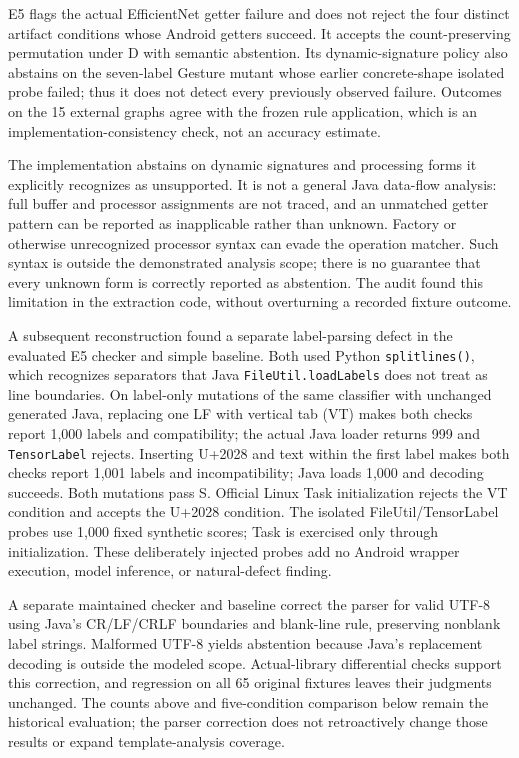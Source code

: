 \documentclass[10pt,twocolumn,letterpaper]{article}
\newcommand{\code}[1]{\texttt{#1}}
\begin{document}
E5 flags the actual EfficientNet getter failure and does not reject the four distinct artifact conditions whose Android getters succeed. It accepts the count-preserving permutation under D with semantic abstention. Its dynamic-signature policy also abstains on the seven-label Gesture mutant whose earlier concrete-shape isolated probe failed; thus it does not detect every previously observed failure. Outcomes on the 15 external graphs agree with the frozen rule application, which is an implementation-consistency check, not an accuracy estimate.

The implementation abstains on dynamic signatures and processing forms it explicitly recognizes as unsupported. It is not a general Java data-flow analysis: full buffer and processor assignments are not traced, and an unmatched getter pattern can be reported as inapplicable rather than unknown. Factory or otherwise unrecognized processor syntax can evade the operation matcher. Such syntax is outside the demonstrated analysis scope; there is no guarantee that every unknown form is correctly reported as abstention. The audit found this limitation in the extraction code, without overturning a recorded fixture outcome.

A subsequent reconstruction found a separate label-parsing defect in the evaluated E5 checker and simple baseline. Both used Python \code{splitlines()}, which recognizes separators that Java \code{FileUtil.loadLabels} does not treat as line boundaries. On label-only mutations of the same classifier with unchanged generated Java, replacing one LF with vertical tab (VT) makes both checks report 1,000 labels and compatibility; the actual Java loader returns 999 and \code{TensorLabel} rejects. Inserting U+2028 and text within the first label makes both checks report 1,001 labels and incompatibility; Java loads 1,000 and decoding succeeds. Both mutations pass S. Official Linux Task initialization rejects the VT condition and accepts the U+2028 condition. The isolated FileUtil/TensorLabel probes use 1,000 fixed synthetic scores; Task is exercised only through initialization. These deliberately injected probes add no Android wrapper execution, model inference, or natural-defect finding.

A separate maintained checker and baseline correct the parser for valid UTF-8 using Java's CR/LF/CRLF boundaries and blank-line rule, preserving nonblank label strings. Malformed UTF-8 yields abstention because Java's replacement decoding is outside the modeled scope. Actual-library differential checks support this correction, and regression on all 65 original fixtures leaves their judgments unchanged. The counts above and five-condition comparison below remain the historical evaluation; the parser correction does not retroactively change those results or expand template-analysis coverage.
\end{document}
